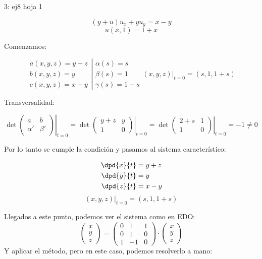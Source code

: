 	\begin{example}{3: ej8 hoja 1}

		\[ (y+u)u_x + y u_y = x-y \]
		\[u(x,1) = 1 + x \]

		Comenzamos:

		\[ \left. \begin{array}{r}
		a(x,y,z) = y+z \\
		b(x,y,z) = y \\
		c(x,y,z) = x-y
		\end{array} \right| \begin{array}{l}
		\alpha(s) = s \\
		\beta(s) = 1 \\
		\gamma(s) = 1+s \end{array}
		(x,y,z)|_{t=0} = (s,1,1+s)
		\]

		Transversalidad:

		\[ \det \left.\begin{pmatrix}
		a  & b \\
		\alpha' & \beta' \end{pmatrix}\right|_{t=0} =
		\det \left.\begin{pmatrix}
		y+z  & y \\
		1 & 0 \end{pmatrix} \right|_{t=0} =
		\det \left.\begin{pmatrix}
		2+s  & 1 \\
		1 & 0 \end{pmatrix} \right|_{t=0} = -1 \neq 0 \]

		Por lo tanto se cumple la condición y pasamos al sistema característico:

		\begin{align*}
			 \dpd{x}{t} &= y+z  \\
			 \dpd{y}{t} &= y \\
			 \dpd{z}{t} &= x-y
		\end{align*}
		$$(x,y,z)|_{t=0} = (s,1,1+s)$$

		Llegados a este punto, podemos ver el sistema como en EDO:
		$$
		\begin{pmatrix}
			x \\
			y \\
			z
		\end{pmatrix}
		=
		\begin{pmatrix}
			0 & 1 & 1 \\
			0 & 1 & 0 \\
			1 & -1 & 0
		\end{pmatrix}
			\cdot
		\begin{pmatrix}
			x \\
			y \\
			z
		\end{pmatrix}
		$$
		Y aplicar el método, pero en este caso, podemos resolverlo a mano:


\end{example}
